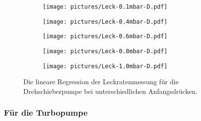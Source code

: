 \begin{figure}[H]
  \begin{subfigure}[c]{0.49\textwidth}
    \texttt{[image: pictures/Leck-0.1mbar-D.pdf]}
  \end{subfigure}\hfill
  \begin{subfigure}[c]{0.49\textwidth}
    \texttt{[image: pictures/Leck-0.4mbar-D.pdf]}
  \end{subfigure}

  \begin{subfigure}[c]{0.49\textwidth}
    \texttt{[image: pictures/Leck-0.6mbar-D.pdf]}
  \end{subfigure}\hfill
  \begin{subfigure}[c]{0.49\textwidth}
    \texttt{[image: pictures/Leck-0.8mbar-D.pdf]}
  \end{subfigure}

  \begin{subfigure}[c]{0.49\textwidth}
    \texttt{[image: pictures/Leck-1.0mbar-D.pdf]}
  \end{subfigure}
  \caption{Die lineare Regression der Leckratenmessung für die Drehschieberpumpe bei unterschiedlichen Anfangsdrücken.}
\end{figure}


\subsubsection{Für die Turbopumpe}
